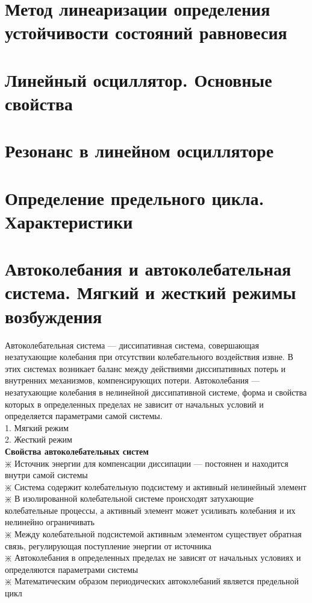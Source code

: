 \begin{multicols*}{2}
		\section{Метод линеаризации определения устойчивости состояний равновесия}

		\section{Линейный осциллятор. Основные свойства}

		\section{Резонанс в линейном осцилляторе}

		\section{Определение предельного цикла. Характеристики}

		\section{Автоколебания и автоколебательная система. Мягкий и жесткий режимы возбуждения}
		Автоколебательная система — диссипативная система, совершающая незатухающие колебания при отсутствии колебательного воздействия извне. В этих системах возникает баланс между действиями диссипативных потерь и внутренних механизмов, компенсирующих потери. Автоколебания — незатухающие колебания в нелинейной диссипативной системе, форма и свойства которых в определенных пределах не зависит от начальных условий и определяется параметрами самой системы.\\
		1. Мягкий режим\\
		2. Жесткий режим\\
		\textbf{Свойства автоколебательных систем}\\
		$\divideontimes$ Источник энергии для компенсации диссипации — постоянен и находится внутри самой системы\\
		$\divideontimes$ Система содержит колебательную подсистему и активный нелинейный элемент\\
		$\divideontimes$ В изолированной колебательной системе происходят затухающие колебательные процессы, а активный элемент может усиливать колебания и их нелинейно ограничивать\\
		$\divideontimes$ Между колебательной подсистемой активным элементом существует обратная связь, регулирующая поступление энергии от источника\\
		$\divideontimes$ Автоколебания в определенных пределах не зависят от начальных условиях и определяются параметрами системы\\
		$\divideontimes$ Математическим образом периодических автоколебаний является предельной цикл


\end{multicols*}
